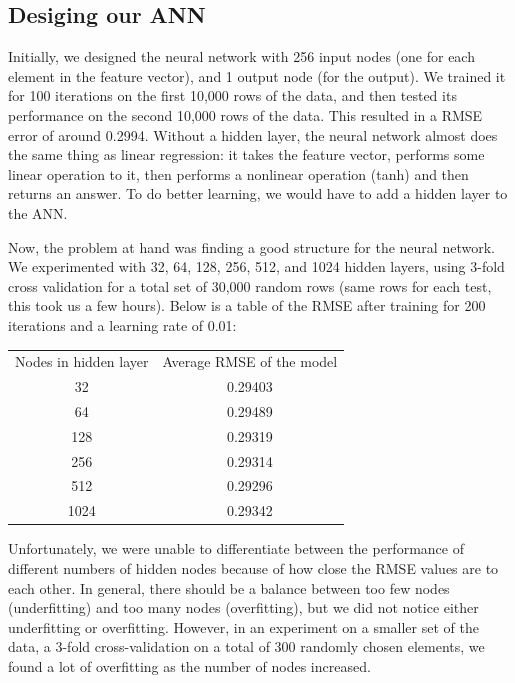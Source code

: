 \documentclass{article}
\begin{document}
\subsection{Desiging our ANN}
Initially, we designed the neural network with 256 input nodes
 (one for each element in the feature vector), and 1 output node
  (for the output).  We trained it for 100 iterations on the first 
  10,000 rows of the data, and then tested its performance on the 
  second 10,000 rows of the data.  This resulted in a RMSE error of
   around 0.2994.  Without a hidden layer, the neural network almost
    does the same thing as linear regression: it takes the feature
     vector, performs some linear operation to it, then performs a 
     nonlinear operation (tanh) and then returns an answer.  To do better
      learning, we would have to add a hidden layer to the ANN.

Now, the problem at hand was finding a good structure for the neural network. 
 We experimented with 
32, 64, 128, 256, 512, and 1024 hidden layers, using 3-fold cross
validation for a total set of 30,000 random rows (same rows for each test,
this took us a few hours).
Below is a table of the RMSE after training for 200 iterations and
a learning rate of 0.01:

\begin{table} 


\begin{tabular}{ c | c }
  Nodes in hidden layer & Average RMSE of the model  \\
  32 & 0.29403  \\
  64 & 0.29489  \\
  128 & 0.29319 \\
  256 & 0.29314 \\
  512 & 0.29296 \\
  1024 & 0.29342 \\
\end{tabular}


\end{table}

Unfortunately, we were unable to differentiate between 
the performance of different numbers of hidden nodes because 
of how close the RMSE values are to each other.  In general,
there should be a balance between too few nodes (underfitting)
and too many nodes (overfitting), but we did not notice
either underfitting or overfitting.  However, in an experiment
on a smaller set of the data, a 3-fold cross-validation on a total of
300 randomly chosen elements, we found a lot of overfitting as the number of
nodes increased.
\end{document}

